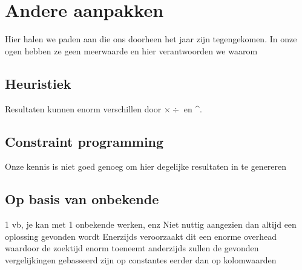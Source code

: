 \documentclass[Main.tex]{subfiles}
\begin{document}
\section{Andere aanpakken}
Hier halen we paden aan die ons doorheen het jaar zijn tegengekomen. In onze ogen hebben ze geen meerwaarde en hier verantwoorden we waarom
\subsection{Heuristiek}
Resultaten kunnen enorm verschillen door $\times \div$ en \^{}.
\subsection{Constraint programming}
Onze kennis is niet goed genoeg om hier degelijke resultaten in te genereren
\subsection{Op basis van onbekende}
1 vb, je kan met 1 onbekende werken, enz
Niet nuttig aangezien dan altijd een oplossing gevonden wordt
Enerzijds veroorzaakt dit een enorme overhead waardoor de zoektijd enorm toeneemt
anderzijds zullen de gevonden vergelijkingen gebasseerd zijn op constantes eerder dan op kolomwaarden
\end{document}
